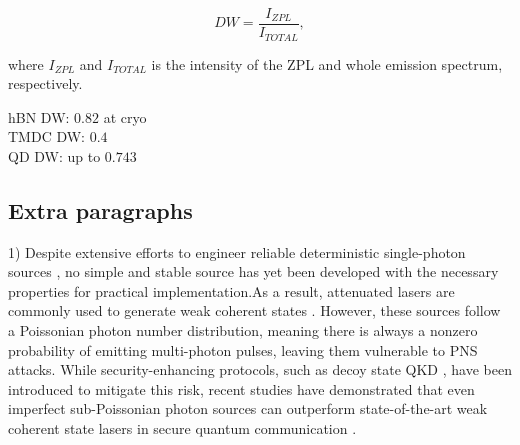\begin{equation}
    DW=\frac{I_{ZPL}}{I_{TOTAL}},
\end{equation}

where $I_{ZPL}$ and $I_{TOTAL}$ is the intensity of the ZPL and whole emission spectrum, respectively. 

hBN DW: $0.82$ \cite{Tran2016} at cryo \\
TMDC DW: $0.4$ \cite{Micevic2022} \\
QD DW: up to $0.743$ \cite{Chen2025} \\


\subsection*{Extra paragraphs}

1) Despite extensive efforts to engineer reliable deterministic single-photon sources \cite{Eisaman2011}, no simple and stable source has yet been developed with the necessary properties for practical implementation.As a result, attenuated lasers are commonly used to generate weak coherent states \cite{Stucki2005}. However, these sources follow a Poissonian photon number distribution, meaning there is always a nonzero probability of emitting multi-photon pulses, leaving them vulnerable to PNS attacks. While security-enhancing protocols, such as decoy state QKD \cite{Lo2005}, have been introduced to mitigate this risk, recent studies have demonstrated that even imperfect sub-Poissonian photon sources can outperform state-of-the-art weak coherent state lasers in secure quantum communication \cite{Ordan2024}.



\newpage